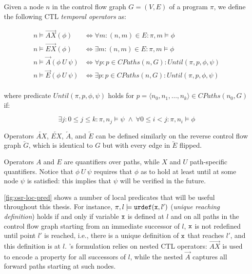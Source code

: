 \begin{definition}
Given a node $n$ in the control flow graph $G=(V,E)$ of a program $\pi$, we define the following CTL {\em temporal operators} as:

\begin{align*}
n \models \overrightarrow{AX}(\phi) &\Longleftrightarrow \forall m: (n,m)\in E: \pi,m\models\phi \\
n \models \overrightarrow{EX}(\phi) &\Longleftrightarrow \exists m: (n,m)\in E: \pi, m\models\phi \\
n \models \overrightarrow{A}(\phi~U~\psi) &\Longleftrightarrow \forall p: p\in CPaths(n,G): Until(\pi, p,\phi,\psi) \\
n \models \overrightarrow{E}(\phi~U~\psi) &\Longleftrightarrow \exists p: p\in CPaths(n,G): Until(\pi, p,\phi,\psi) \\
\end{align*}

\vspace{-0.5em}
\noindent where predicate $Until(\pi,p,\phi,\psi)$ holds for $p = \langle n_0,n_1,\ldots,n_k\rangle \in CPaths(n_0,G)$ if:
\vspace{-0.5em}

\begin{equation*}
\exists j: 0 \le j\le k: \pi, n_j \models \psi \; \wedge \: \forall 0 \le i < j: \pi, n_i \models \phi
\end{equation*}

\noindent Operators $\overleftarrow{AX}$, $\overleftarrow{EX}$, $\overleftarrow{A}$, and $\overleftarrow{E}$ can be defined similarly on the reverse control flow graph $\overleftarrow{G}$, which is identical to $G$ but with every edge in $\overleftarrow{E}$ flipped.
\end{definition}

\noindent Operators $A$ and $E$ are quantifiers over paths, while $X$ and $U$ path-specific quantifiers. Notice that $\phi~U~\psi$ requires that $\phi$ as to hold at least until at some node $\psi$ is satisfied: this implies that $\psi$ will be verified in the future.

\myfigure\ref{fig:osr-loc-pred} shows a number of local predicates that will be useful throughout this thesis. For instance, $\pi,l\models \text{${\tt urdef}$}(\text{${\tt x}$}, l')$ ({\em unique reaching definition}) holds if and only if variable $\text{${\tt x}$}$ is defined at $l$ and on all paths in the control flow graph starting from an immediate successor of $l$, $\text{${\tt x}$}$ is not redefined until point $l'$ is reached, i.e., there is a unique definition of $\text{${\tt x}$}$ that reaches $l'$, and this definition is at $l$. \ureachdef's formulation relies on nested CTL operators: $\overrightarrow{AX}$ is used to encode a property for all successors of $l$, while the nested $\overrightarrow{A}$ captures all forward paths starting at such nodes.

